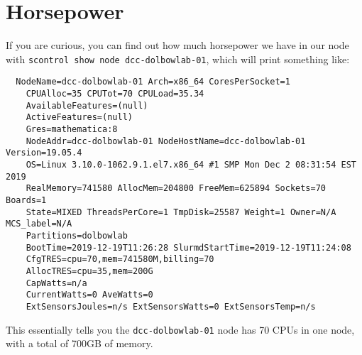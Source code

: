 \documentclass[class=Report, crop=false]{standalone}
\begin{document}
\section{Horsepower}

If you are curious, you can find out how much horsepower we have in our node with \texttt{scontrol show node dcc-dolbowlab-01}, which will print something like:

\begin{verbatim}
  NodeName=dcc-dolbowlab-01 Arch=x86_64 CoresPerSocket=1
    CPUAlloc=35 CPUTot=70 CPULoad=35.34
    AvailableFeatures=(null)
    ActiveFeatures=(null)
    Gres=mathematica:8
    NodeAddr=dcc-dolbowlab-01 NodeHostName=dcc-dolbowlab-01 Version=19.05.4
    OS=Linux 3.10.0-1062.9.1.el7.x86_64 #1 SMP Mon Dec 2 08:31:54 EST 2019
    RealMemory=741580 AllocMem=204800 FreeMem=625894 Sockets=70 Boards=1
    State=MIXED ThreadsPerCore=1 TmpDisk=25587 Weight=1 Owner=N/A MCS_label=N/A
    Partitions=dolbowlab
    BootTime=2019-12-19T11:26:28 SlurmdStartTime=2019-12-19T11:24:08
    CfgTRES=cpu=70,mem=741580M,billing=70
    AllocTRES=cpu=35,mem=200G
    CapWatts=n/a
    CurrentWatts=0 AveWatts=0
    ExtSensorsJoules=n/s ExtSensorsWatts=0 ExtSensorsTemp=n/s
\end{verbatim}

\noindent This essentially tells you the \texttt{dcc-dolbowlab-01} node has 70 CPUs in one node, with a total of 700GB of memory. 
\end{document}
